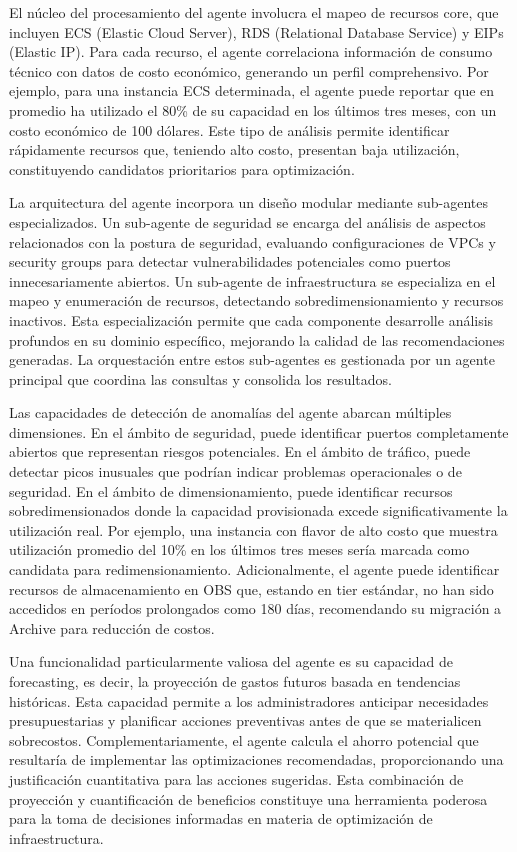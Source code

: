 El núcleo del procesamiento del agente involucra el mapeo de recursos core, que incluyen ECS (Elastic Cloud Server), RDS (Relational Database Service) y EIPs (Elastic IP). Para cada recurso, el agente correlaciona información de consumo técnico con datos de costo económico, generando un perfil comprehensivo. Por ejemplo, para una instancia ECS determinada, el agente puede reportar que en promedio ha utilizado el 80\% de su capacidad en los últimos tres meses, con un costo económico de 100 dólares. Este tipo de análisis permite identificar rápidamente recursos que, teniendo alto costo, presentan baja utilización, constituyendo candidatos prioritarios para optimización.

La arquitectura del agente incorpora un diseño modular mediante sub-agentes especializados. Un sub-agente de seguridad se encarga del análisis de aspectos relacionados con la postura de seguridad, evaluando configuraciones de VPCs y security groups para detectar vulnerabilidades potenciales como puertos innecesariamente abiertos. Un sub-agente de infraestructura se especializa en el mapeo y enumeración de recursos, detectando sobredimensionamiento y recursos inactivos. Esta especialización permite que cada componente desarrolle análisis profundos en su dominio específico, mejorando la calidad de las recomendaciones generadas. La orquestación entre estos sub-agentes es gestionada por un agente principal que coordina las consultas y consolida los resultados.

Las capacidades de detección de anomalías del agente abarcan múltiples dimensiones. En el ámbito de seguridad, puede identificar puertos completamente abiertos que representan riesgos potenciales. En el ámbito de tráfico, puede detectar picos inusuales que podrían indicar problemas operacionales o de seguridad. En el ámbito de dimensionamiento, puede identificar recursos sobredimensionados donde la capacidad provisionada excede significativamente la utilización real. Por ejemplo, una instancia con flavor de alto costo que muestra utilización promedio del 10\% en los últimos tres meses sería marcada como candidata para redimensionamiento. Adicionalmente, el agente puede identificar recursos de almacenamiento en OBS que, estando en tier estándar, no han sido accedidos en períodos prolongados como 180 días, recomendando su migración a Archive para reducción de costos.

Una funcionalidad particularmente valiosa del agente es su capacidad de forecasting, es decir, la proyección de gastos futuros basada en tendencias históricas. Esta capacidad permite a los administradores anticipar necesidades presupuestarias y planificar acciones preventivas antes de que se materialicen sobrecostos. Complementariamente, el agente calcula el ahorro potencial que resultaría de implementar las optimizaciones recomendadas, proporcionando una justificación cuantitativa para las acciones sugeridas. Esta combinación de proyección y cuantificación de beneficios constituye una herramienta poderosa para la toma de decisiones informadas en materia de optimización de infraestructura.

